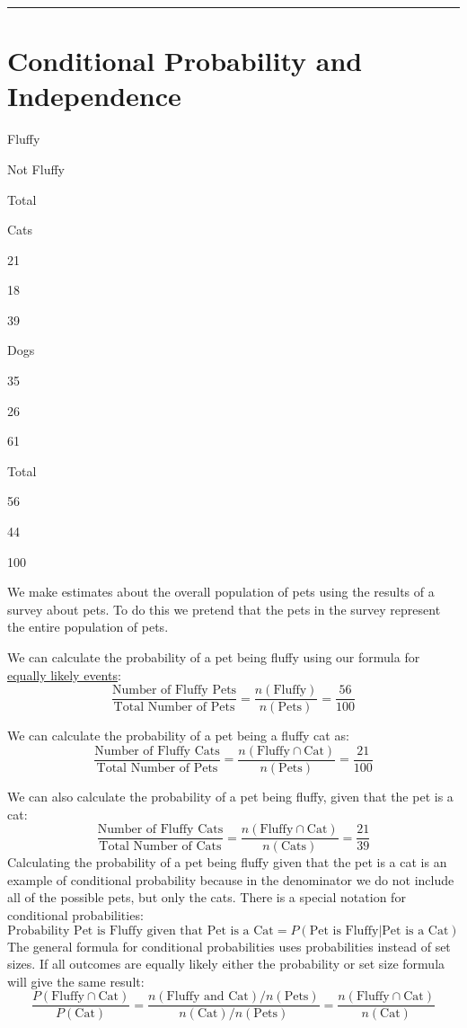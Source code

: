 \documentclass[
]{book}
\begin{document}
\begin{center}\rule{0.5\linewidth}{0.5pt}\end{center}

\hypertarget{conditional-probability-and-independence}{%
\section{Conditional Probability and Independence}\label{conditional-probability-and-independence}}

Fluffy

Not Fluffy

Total

Cats

21

18

39

Dogs

35

26

61

Total

56

44

100

We make estimates about the overall population of pets using the results of a survey about pets. To do this we pretend that the pets in the survey represent the entire population of pets.

We can calculate the probability of a pet being fluffy using our formula for \protect\hyperlink{equiprob}{equally likely events}:
\[\frac{\text{Number of Fluffy Pets}}{\text{Total Number of Pets}} = \frac{n(\text{Fluffy})}{n(\text{Pets})} = \frac{56}{100}\]

We can calculate the probability of a pet being a fluffy cat as:
\[\frac{\text{Number of Fluffy Cats}}{\text{Total Number of Pets}} = \frac{n(\text{Fluffy} \cap \text{Cat})}{n(\text{Pets})} = \frac{21}{100}\]

We can also calculate the probability of a pet being fluffy, given that the pet is a cat:
\[\frac{\text{Number of Fluffy Cats}}{\text{Total Number of Cats}} = \frac{n(\text{Fluffy} \cap \text{Cat})}{n(\text{Cats})}=\frac{21}{39}\]
Calculating the probability of a pet being fluffy given that the pet is a cat is an example of conditional probability because in the denominator we do not include all of the possible pets, but only the cats. There is a special notation for conditional probabilities:
\[\text{Probability Pet is Fluffy given that Pet is a Cat} = P(\text{Pet is Fluffy}|\text{Pet is a Cat})\]
The general formula for conditional probabilities uses probabilities instead of set sizes. If all outcomes are equally likely either the probability or set size formula will give the same result:
\[\frac{P(\text{Fluffy} \cap \text{Cat})}{P(\text{Cat})} =  
\frac{n(\text{Fluffy and Cat})/n(\text{Pets})}{n(\text{Cat})/n(\text{Pets})} = \frac{n(\text{Fluffy}\cap\text{Cat})}{n(\text{Cat})}\]
\end{document}
